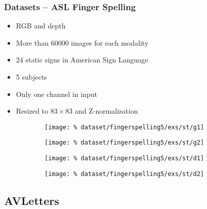 \begin{frame}
\frametitle{Datasets -- ASL Finger Spelling}
  \begin{itemize}
    \item RGB and depth
    \item More than 60000 images for each modality
    \item 24 static signs in American Sign Language
    \item 5 subjects
    \item Only one channel in input
    \item Resized to $83 \times 83$ and Z-normalization
  \end{itemize}
  \begin{figure}[H]
    \centering
    \hfill
    \begin{subfigure}{0.21\linewidth}
      \centering
      \texttt{[image: \%
        dataset/fingerspelling5/exs/st/g1]}
      \caption{}
    \end{subfigure}
    \hfill
    \begin{subfigure}{0.21\linewidth}
      \centering
      \texttt{[image: \%
        dataset/fingerspelling5/exs/st/g2]}
      \caption{}
    \end{subfigure}
    \hfill
    \begin{subfigure}{0.21\linewidth}
      \centering
      \texttt{[image: \%
        dataset/fingerspelling5/exs/st/d1]}
      \caption{}
    \end{subfigure}
    \hfill
    \begin{subfigure}{0.21\linewidth}
      \centering
      \texttt{[image: \%
        dataset/fingerspelling5/exs/st/d2]}
      \caption{}
    \end{subfigure}
  \end{figure}
\end{frame}

\subsection{AVLetters}

